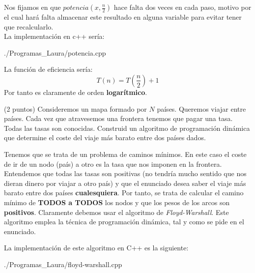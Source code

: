 \documentclass[12pt]{article}
\begin{document}
\begin{ejercicio}
        Nos fijamos en que $potencia(x,\frac{n}{2})$ hace falta dos veces 
        en cada paso, motivo por el cual hará falta almacenar este resultado 
        en alguna variable para evitar tener que recalcularlo.\\
        La implementación en c++ sería:

        \begin{minipage}{0.9\linewidth} %
            
            {./Programas_Laura/potencia.cpp}
        \end{minipage}

        La función de eficiencia sería:
        \begin{equation*}
            T(n) = T(\frac{n}{2}) + 1
        \end{equation*}
        Por tanto es claramente de orden \textbf{logarítmico}.
    \end{ejercicio}

    \begin{ejercicio}
        (2 puntos) Consideremos un mapa formado por $N$ países. 
        Queremos viajar entre países. Cada vez
        que atravesemos una frontera tenemos que pagar una tasa. 
        Todas las tasas son conocidas. Construid
        un algoritmo de programación dinámica que determine el 
        coste del viaje más barato entre dos países
        dados.

        Tenemos que se trata de un problema de caminos mínimos.
        En este caso el coste de ir de un nodo (país) a otro 
        es la tasa que nos imponen en la frontera.
        Entendemos 
        que todas las tasas son positivas (no tendría mucho 
        sentido que nos dieran dinero por viajar a otro país) 
        y que el enunciado desea saber el viaje más barato entre 
        dos países \textbf{cualesquiera}. Por tanto, se trata 
        de calcular el camino mínimo de \textbf{TODOS a TODOS} los nodos 
        y que los pesos de los arcos son \textbf{positivos}.
        Claramente debemos usar el algoritmo de \textit{Floyd-Warshall}.
        Este algoritmo emplea la técnica de programación dinámica,
        tal y como se pide en el enunciado.

        La implementación de este algoritmo en C++ es la siguiente:

        \begin{minipage}{0.9\linewidth} %
            
            {./Programas_Laura/floyd-warshall.cpp}
        \end{minipage}
    \end{ejercicio}
\end{document}
